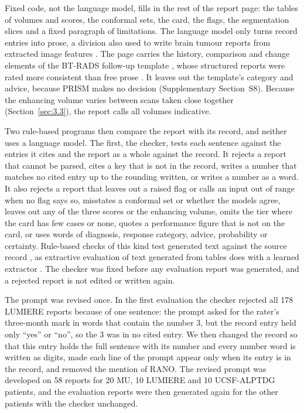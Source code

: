 Fixed code, not the language model, fills in the rest of the report page: the tables of volumes and scores, the
conformal sets, the card, the flags, the segmentation slices and a fixed paragraph of limitations. The language model
only turns record entries into prose, a division also used to write brain tumour reports from extracted image
features \citep{herasrivera2026}. The page carries the history, comparison and change elements of the BT-RADS
follow-up template \citep{weinberg2018}, whose structured reports were rated more consistent than free prose
\citep{gore2019}. It leaves out the template's category and advice, because PRISM makes no decision (Supplementary
Section~S8). Because the enhancing volume varies between scans taken close together (Section~\ref{sec:3.3}), the
report calls all volumes indicative.

Two rule-based programs then compare the report with its record, and neither uses a language model. The first, the
checker, tests each sentence against the entries it cites and the report as a whole against the record. It rejects a
report that cannot be parsed, cites a key that is not in the record, writes a number that matches no cited entry up to
the rounding written, or writes a number as a word. It also rejects a report that leaves out a raised flag or calls an
input out of range when no flag says so, misstates a conformal set or whether the models agree, leaves out any of the
three scores or the enhancing volume, omits the tier where the card has few cases or none, quotes a performance figure
that is not on the card, or uses words of diagnosis, response category, advice, probability or certainty. Rule-based
checks of this kind test generated text against the source record \citep{zeba2026}, as extractive evaluation of text
generated from tables does with a learned extractor \citep{wiseman2017}. The checker was fixed before any evaluation
report was generated, and a rejected report is not edited or written again.

The prompt was revised once. In the first evaluation the checker rejected all 178 LUMIERE reports because of one
sentence: the prompt asked for the rater's three-month mark in words that contain the number 3, but the record entry
held only ``yes'' or ``no'', so the 3 was in no cited entry. We then changed the record so that this entry holds the
full sentence with its number and every number word is written as digits, made each line of the prompt appear only
when its entry is in the record, and removed the mention of RANO. The revised prompt was developed on 58 reports for
20 MU, 10 LUMIERE and 10 UCSF-ALPTDG patients, and the evaluation reports were then generated again for the other
patients with the checker unchanged.


